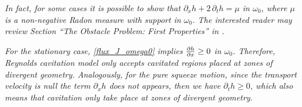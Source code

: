 \begin{remark}
\it
In fact, for some cases it is possible to show that $\partial _x h +2\,\partial _t h=\mu$ in $\omega_0$, where $\mu$ is a non-negative Radon measure with support in $\omega_0$. The interested reader may review Section ``The Obstacle Problem: First Properties'' in \cite{kinderlehrer1980}.
\end{remark}
\begin{remark}\it
For the stationary case, \eqref{flux_J_omega0} implies $\frac{\partial h}{\partial x} \geq 0$ in $\omega_0$. Therefore, Reynolds cavitation model only accepts cavitated regions placed at zones of divergent geometry. Analogously, for the pure squeeze motion, since the transport velocity is null the term $\partial _x h$ does not appears, then we have $\partial _t h \geq 0$, which also means that cavitation only take place at zones of divergent geometry.
\end{remark}


